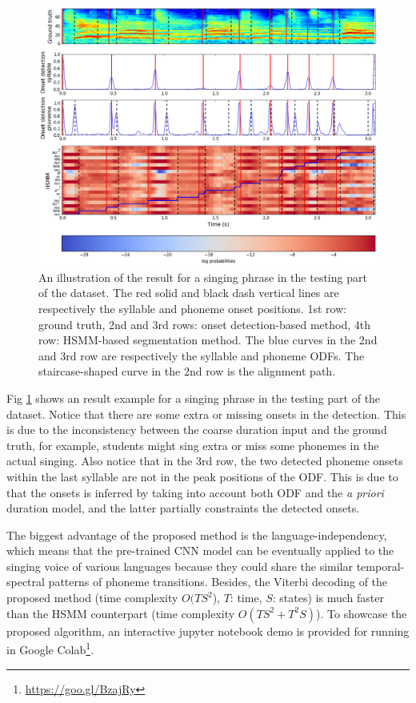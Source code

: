 \begin{figure}[ht!]
    \centering
    \includegraphics[width=\textwidth]{figs/results/ch5_results_segmentation.png}
    \caption{An illustration of the result for a singing phrase in the testing part of the dataset. The red solid and black dash vertical lines are respectively the syllable and phoneme onset positions. 1st row: ground truth, 2nd and 3rd rows: onset detection-based method, 4th row: HSMM-based segmentation method. The blue curves in the 2nd and 3rd row are respectively the syllable and phoneme ODFs. The staircase-shaped curve in the 2nd row is the alignment path.}
    \label{fig:ch5:results_example_onset}
\end{figure}


Fig \ref{fig:ch5:results_example_onset} shows an result example for a singing phrase in the testing part of the dataset. Notice that there are some extra or missing onsets in the detection. This is due to the inconsistency between the coarse duration input and the ground truth, for example, students might sing extra or miss some phonemes in the actual singing. Also notice that in the 3rd row, the two detected phoneme onsets within the last syllable are not in the peak positions of the ODF. This is due to that the onsets is inferred by taking into account both ODF and the \textit{a priori} duration model, and the latter partially constraints the detected onsets.

The biggest advantage of the proposed method is the language-independency, which means that the pre-trained CNN model can be eventually applied to the singing voice of various languages because they could share the similar temporal-spectral patterns of phoneme transitions. Besides, the Viterbi decoding of the proposed method (time complexity $O(TS^2$), $T$: time, $S$: states) is much faster than the HSMM counterpart (time complexity $O(TS^2+T^2S)$). To showcase the proposed algorithm, an interactive jupyter notebook demo is provided for running in Google Colab\footnote{\url{https://goo.gl/BzajRy}}. 

